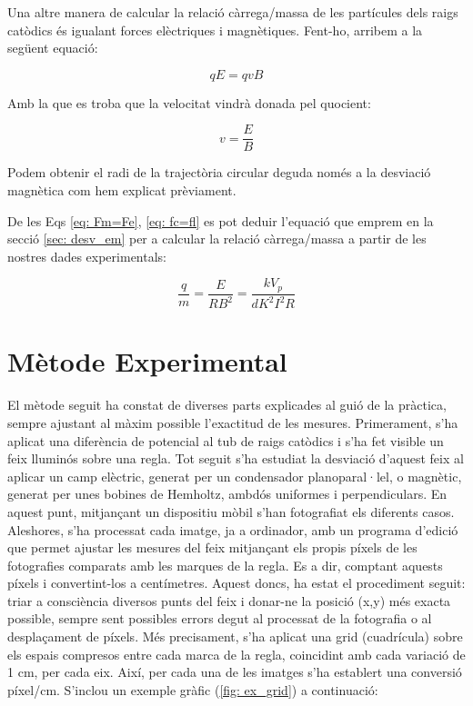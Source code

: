 \documentclass[11pt]{article}
\begin{document}
\vspace{1cm}

Una altre manera de calcular la relació càrrega/massa de les partícules dels raigs catòdics és igualant forces elèctriques i magnètiques. Fent-ho, arribem a la següent equació:

\begin{equation}\label{eq: Fm=Fe}
    qE = qvB
\end{equation}

Amb la que es troba que la velocitat vindrà donada pel quocient:

\begin{equation}
    v = \frac{E}{B}
\end{equation}

Podem obtenir el radi de la trajectòria circular deguda només a la desviació magnètica com hem explicat prèviament.

De les Eqs \eqref{eq: Fm=Fe}, \eqref{eq: fc=fl} es pot deduir l'equació que emprem en la secció \ref{sec: desv_em} per a calcular la relació càrrega/massa a partir de les nostres dades experimentals:

\begin{equation}
    \frac{q}{m}=\frac{E}{RB^2}=\frac{kV_p}{dK^2I^2R}
\end{equation}

\newpage
\section{Mètode Experimental}

El mètode seguit ha constat de diverses parts explicades al guió de la pràctica, sempre ajustant al màxim possible l'exactitud de les mesures. Primerament, s'ha aplicat una diferència de potencial al tub de raigs catòdics i s'ha fet visible un feix lluminós sobre una regla. Tot seguit s'ha estudiat la desviació d'aquest feix al aplicar un camp elèctric, generat per un condensador planoparal·lel, o magnètic, generat per unes bobines de Hemholtz, ambdós uniformes i perpendiculars.  
En aquest punt, mitjançant un dispositiu mòbil s'han fotografiat els diferents casos. Aleshores, s'ha processat cada imatge, ja a ordinador, amb un programa d'edició que permet ajustar les mesures del feix mitjançant els propis píxels de les fotografies comparats amb les marques de la regla. Es a dir, comptant aquests píxels i convertint-los a centímetres. Aquest doncs, ha estat el procediment seguit: triar a consciència diversos punts del feix i donar-ne la posició (x,y) més exacta possible, sempre sent possibles errors degut al processat de la fotografia o al desplaçament de píxels. Més precisament, s'ha aplicat una grid (cuadrícula) sobre els espais compresos entre cada marca de la regla, coincidint amb cada variació de 1 cm, per cada eix. Així, per cada una de les imatges s'ha establert una conversió píxel/cm. S'inclou un exemple gràfic (\ref{fig: ex_grid}) a continuació:
\end{document}
